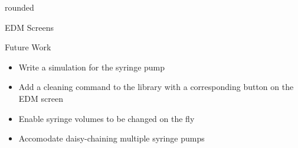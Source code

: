 \documentclass[a0paper,landscape]{baposter}
\begin{document}
\begin{poster}
\begin{posterbox}[name=edmimage,column=3,headerfont={},headershape=rounded,boxheaderheight=0em,boxColorOne=white,borderColor=white]{rounded}
\begin{figure}[H]
\end{figure}
\end{posterbox}
\begin{posterbox}[name=edmscreenexp,column=3,below=edmimage]{EDM Screens}
\end{posterbox}
\begin{posterbox}[name=futurework,column=3,above=bottom]{Future Work}
 \begin{itemize}
    \item Write a simulation for the syringe pump 
    \item Add a cleaning command to the library with a corresponding button on the EDM screen 
    \item Enable syringe volumes to be changed on the fly 
    \item Accomodate daisy-chaining multiple syringe pumps 
\end{itemize}
\end{posterbox}

\end{poster}
\end{document}
